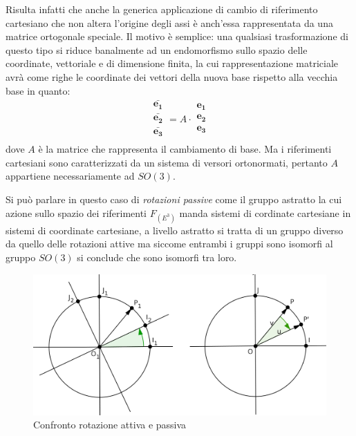 \documentclass[11pt]{report}
\theoremstyle{plain}
\theoremstyle{definition}
\theoremstyle{remark}
\begin{document}
Risulta infatti che anche la generica applicazione di cambio di riferimento cartesiano che non altera l'origine degli assi è anch'essa rappresentata da una matrice ortogonale speciale. Il motivo è semplice: una qualsiasi trasformazione di questo tipo si riduce banalmente ad un endomorfismo sullo spazio delle coordinate, vettoriale e di dimensione finita, la cui rappresentazione matriciale avrà come righe le coordinate dei vettori della nuova base rispetto alla vecchia base in quanto:
\begin{equation}\label{eq:azionedestrariferimenti}
\begin{array}{|c|}
 \bar{\mathbf{e_{1}}} \\
 \bar{\mathbf{e_{2}}}\\
 \bar{\mathbf{e_{3}}}\\
\end{array} = A \cdot \begin{array}{|c|}
 \mathbf{e_{1}} \\
 \mathbf{e_{2}}\\
 \mathbf{e_{3}}\\
\end{array}
\end{equation}
dove $A$ è la matrice che rappresenta il cambiamento di base.
Ma i riferimenti cartesiani sono caratterizzati da un sistema di versori ortonormati, pertanto $A$ appartiene necessariamente ad $SO(3)$.

Si può parlare in questo caso di \emph{rotazioni passive} come il gruppo astratto la cui azione sullo spazio dei riferimenti $F_{(E^{3})}$ manda sistemi di cordinate cartesiane in sistemi di coordinate cartesiane, a livello astratto si tratta di un gruppo diverso da quello delle rotazioni attive ma siccome entrambi i gruppi sono isomorfi al gruppo $SO(3)$ si conclude che sono isomorfi tra loro. 

\begin{figure}[!h]	\label{fig:confrontorotazioni}
\centering
\includegraphics[width=12cm,keepaspectratio]{immagini/Capitolo_III/rotazioniattivepassive}	
\caption{Confronto rotazione attiva e passiva}
\end{figure}
\end{document}
